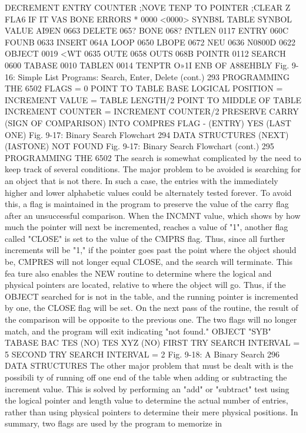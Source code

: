\documentclass{book}
\begin{document}
{{{{{{{{{DECREMENT ENTRY COUNTER
;NOVE TENP TO POINTER
;CLEAR Z FLA6 IF IT VAS BONE
ERRORS * 0000 <0000>
SYNB8L TABLE
SYNBOL VALUE
AI9EN 0663 DELETE 065? BONE 068? fNTLEN 0117
ENTRY 060C FOUNB 0633 INSERT 064A LOOP 0650
LBOPE 0672 NEU 0636 N0800D 0622 OBJECT 0019
<WT 0635 OUTE 0658 OUTS 068B POINTR 0112
SEARCH 0600 TABASE 0010 TABLEN 0014 TENPTR O»1I
ENB OF A88EHBLY
Fig. 9-16: Simple List Programs: Search, Enter, Delete (cont.)
293
PROGRAMMING THE 6502
FLAGS = 0
POINT TO TABLE BASE
LOGICAL POSITION = INCREMENT VALUE
= TABLE LENGTH/2
POINT TO MIDDLE OF TABLE
INCREMENT COUNTER = INCREMENT COUNTER/2
PRESERVE CARRY (SIGN OF COMPARISON)
INTO COMPRES FLAG
- (ENTRY)
YES
(LAST ONE)
Fig. 9-17: Binary Search Flowchart
294
DATA STRUCTURES
(NEXT) (IASTONE)
NOT
FOUND
Fig. 9-17: Binary Search Flowchart (cont.)
295
PROGRAMMING THE 6502
The search is somewhat complicated by the need to keep track of
several conditions. The major problem to be avoided is searching for an
object that is not there. In such a case, the entries with the immediately
higher and lower alphabetic values could be alternately tested forever.
To avoid this, a flag is maintained in the program to preserve the value
of the carry flag after an unsuccessful comparison. When the INCMNT
value, which shows by how much the pointer will next be incremented,
reaches a value of "1", another flag called "CLOSE" is set to the value
of the CMPRS flag. Thus, since all further increments will be "1," if
the pointer goes past the point where the object should be, CMPRES
will not longer equal CLOSE, and the search will terminate. This fea
ture also enables the NEW routine to determine where the logical and
physical pointers are located, relative to where the object will go.
Thus, if the OBJECT searched for is not in the table, and the
running pointer is incremented by one, the CLOSE flag will be set.
On the next pass of the routine, the result of the comparison will be
opposite to the previous one. The two flags will no longer match,
and the program will exit indicating "not found."
OBJECT
"SYB"
TABASE
BAC
TES
(NO)
TES
XYZ
(NO)
FIRST TRY
SEARCH INTERVAL = 5
SECOND TRY
SEARCH INTERVAL = 2
Fig. 9-18: A Binary Search
296
DATA STRUCTURES
The other major problem that must be dealt with is the possibili
ty of running off one end of the table when adding or subtracting
the increment value. This is solved by performing an "add" or
"subtract" test using the logical pointer and length value to determine
the actual number of entries, rather than using physical pointers to
determine their mere physical positions.
In summary, two flags are used by the program to memorize in
}}}}}}}}}
\end{document}
